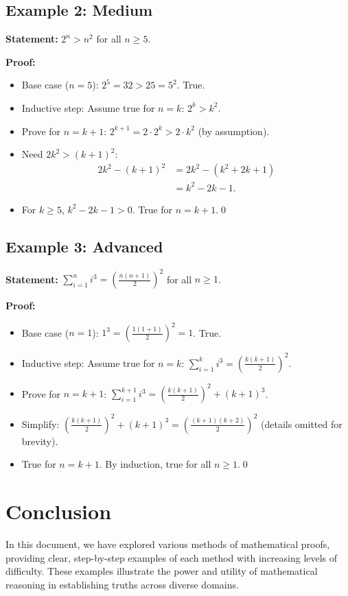 \documentclass[12pt,a4paper]{article}
\begin{document}
\subsection{Example 2: Medium}
\textbf{Statement:} $2^n > n^2$ for all $n \geq 5$.

\textbf{Proof:}
\begin{itemize}
    \item Base case ($n=5$): $2^5 = 32 > 25 = 5^2$. True.
    \item Inductive step: Assume true for $n=k$: $2^k > k^2$.
    \item Prove for $n=k+1$: $2^{k+1} = 2 \cdot 2^k > 2 \cdot k^2$ (by assumption).
    \item Need $2k^2 > (k+1)^2$:
    \begin{align*}
        2k^2 - (k+1)^2 &= 2k^2 - (k^2 + 2k + 1) \\
        &= k^2 - 2k - 1.
    \end{align*}
    \item For $k\geq 5$, $k^2 - 2k - 1 > 0$. True for $n=k+1$.\qed
\end{itemize}

\subsection{Example 3: Advanced}
\textbf{Statement:} $\sum_{i=1}^n i^3 = \left(\frac{n(n+1)}{2}\right)^2$ for all $n \geq 1$.

\textbf{Proof:}
\begin{itemize}
    \item Base case ($n=1$): $1^3 = \left(\frac{1(1+1)}{2}\right)^2 = 1$. True.
    \item Inductive step: Assume true for $n=k$: $\sum_{i=1}^k i^3 = \left(\frac{k(k+1)}{2}\right)^2$.
    \item Prove for $n=k+1$: $\sum_{i=1}^{k+1} i^3 = \left(\frac{k(k+1)}{2}\right)^2 + (k+1)^3$.
    \item Simplify: $\left(\frac{k(k+1)}{2}\right)^2 + (k+1)^3 = \left(\frac{(k+1)(k+2)}{2}\right)^2$ (details omitted for brevity).
    \item True for $n=k+1$. By induction, true for all $n\geq1$.\qed
\end{itemize}

\newpage

\section{Conclusion}
In this document, we have explored various methods of mathematical proofs, providing clear, step-by-step examples of each method with increasing levels of difficulty. These examples illustrate the power and utility of mathematical reasoning in establishing truths across diverse domains.
\end{document}
